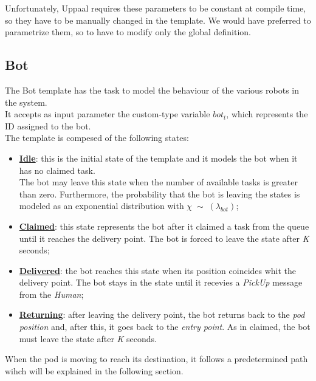 \documentclass[10pt,a4paper]{article}
\begin{document}
			Unfortunately, Uppaal requires these parameters to be constant at compile time, so they have to be manually changed in the template. We would have preferred to parametrize them, so to have to modify only the global definition. 
			
		
		\subsection{Bot}
			The Bot template has the task to model the behaviour of the various robots in the system. \\
			It accepts as input parameter the custom-type variable $bot_t$, which represents the ID assigned to the bot.\\
			The template is compesed of the following states:
			\begin{itemize}
				\item \textbf{\underline{Idle}}: this is the initial state of the template and it models the bot when it has no claimed task.\\The bot may leave this state when the number of available tasks is greater than zero. Furthermore, the probability that the bot is leaving the states is modeled as an exponential distribution with $\chi\;\sim\;(\lambda_{bot})$;
				\item \textbf{\underline{Claimed}}: this state represents the bot after it claimed a task from the queue until it reaches the delivery point. The bot is forced to leave the state after \emph{K} seconds;
				\item \textbf{\underline{Delivered}}: the bot reaches this state when its position coincides whit the delivery point. The bot stays in the state until it recevies a \emph{PickUp} message from the \emph{Human};
				\item \textbf{\underline{Returning}}: after leaving the delivery point, the bot returns back to the \emph{pod position} and, after this, it goes back to the \emph{entry point}. As in claimed, the bot must leave the state after \emph{K} seconds.
			\end{itemize}
			When the pod is moving to reach its destination, it follows a predetermined path wihch will be explained in the following section.
\end{document}
